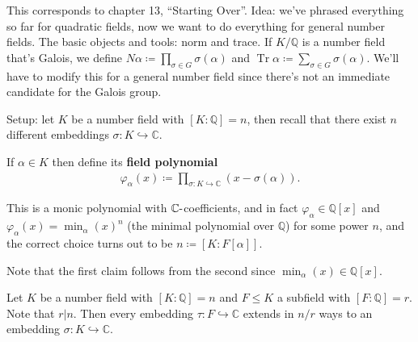 \begin{remark}

This corresponds to chapter 13, ``Starting Over''. Idea: we've phrased
everything so far for quadratic fields, now we want to do everything for
general number fields. The basic objects and tools: norm and trace. If
\(K/{\mathbb{Q}}\) is a number field that's Galois, we define
\(N \alpha \coloneqq\prod_{ \sigma \in G} \sigma( \alpha)\) and
\(\operatorname{Tr}\alpha \coloneqq\sum_{ \sigma\in G } \sigma( \alpha)\).
We'll have to modify this for a general number field since there's not
an immediate candidate for the Galois group.

Setup: let \(K\) be a number field with \([K: {\mathbb{Q}}] = n\), then
recall that there exist \(n\) different embeddings
\(\sigma: K \hookrightarrow{\mathbb{C}}\).

\end{remark}

\begin{definition}

If \(\alpha\in K\) then define its \textbf{field polynomial}
\begin{align*}
\varphi_{ \alpha}(x) \coloneqq\prod_{\sigma: K\hookrightarrow{\mathbb{C}}} (x - \sigma( \alpha) )
.\end{align*}

\end{definition}

\begin{proposition}

This is a monic polynomial with \({\mathbb{C}}{\hbox{-}}\)coefficients,
and in fact \(\varphi_{ \alpha} \in {\mathbb{Q}}[x]\) and
\(\varphi_{ \alpha}(x) = \min_{ \alpha} (x)^n\) (the minimal polynomial
over \({\mathbb{Q}}\)) for some power \(n\), and the correct choice
turns out to be \(n \coloneqq[K: F[ \alpha] ]\).

\end{proposition}

\begin{remark}

Note that the first claim follows from the second since
\(\min_{ \alpha}(x) \in {\mathbb{Q}}[x]\).

\end{remark}

\begin{lemma}

Let \(K\) be a number field with \([K: {\mathbb{Q}}] = n\) and
\(F\leq K\) a subfield with \([F: {\mathbb{Q}}] = r\). Note that
\(r\mathrel{\Big|}n\). Then every embedding
\(\tau: F\hookrightarrow{\mathbb{C}}\) extends in \(n/r\) ways to an
embedding \(\sigma: K \hookrightarrow{\mathbb{C}}\).

\end{lemma}

